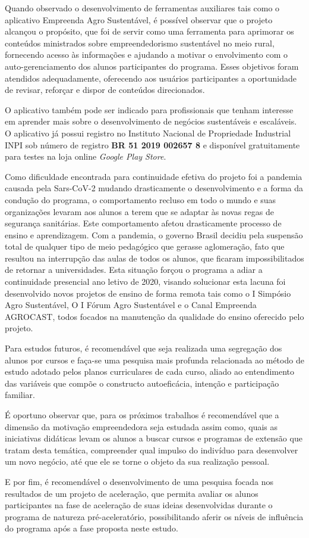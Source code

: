 Quando observado o desenvolvimento de ferramentas auxiliares tais como o aplicativo Empreenda Agro Sustentável, é possível observar que o projeto alcançou o propósito, que foi de servir como uma ferramenta para aprimorar os conteúdos ministrados sobre empreendedorismo sustentável no meio rural, fornecendo acesso às informações e ajudando a motivar o envolvimento com o auto-gerenciamento dos alunos participantes do programa. Esses objetivos foram atendidos adequadamente, oferecendo aos usuários participantes a oportunidade de revisar, reforçar e dispor de conteúdos direcionados.

O aplicativo também pode ser indicado para profissionais que tenham interesse em aprender mais sobre o desenvolvimento de negócios sustentáveis e escaláveis. O aplicativo já possui registro no Instituto Nacional de Propriedade Industrial INPI sob número de registro \textbf{BR 51 2019 002657 8} e disponível gratuitamente para testes na loja online \textit{Google Play Store}.


Como dificuldade encontrada para continuidade efetiva do projeto foi a pandemia causada pela Sars-CoV-2 mudando drasticamente o desenvolvimento e a forma da condução do programa, o comportamento recluso em todo o mundo  e suas organizações levaram aos alunos a terem que se adaptar às novas regas de segurança sanitárias. Este comportamento afetou drasticamente  processo de ensino e aprendizagem. Com a pandemia, o governo Brasil decidiu pela suspensão total de qualquer tipo de meio pedagógico que gerasse aglomeração, fato que resultou na interrupção das aulas de todos os alunos, que ficaram impossibilitados de retornar a universidades. Esta situação forçou o programa a adiar a continuidade presencial ano letivo de 2020, visando solucionar esta lacuna foi desenvolvido novos projetos de ensino de forma remota tais como o I Simpósio Agro Sustentável, O I Fórum Agro Sustentável e o Canal Empreenda AGROCAST, todos focados na manutenção da qualidade do ensino oferecido pelo projeto.

Para estudos futuros, é recomendável que seja realizada uma segregação dos alunos por cursos e faça-se uma pesquisa mais profunda relacionada ao método de estudo adotado pelos planos curriculares de cada curso, aliado ao entendimento das variáveis que compõe o constructo autoeficácia, intenção e participação familiar.

É oportuno observar que, para os próximos trabalhos é recomendável que a dimensão da motivação empreendedora seja estudada assim como, quais as iniciativas didáticas levam os alunos a buscar cursos e programas de extensão que tratam desta temática, compreender qual impulso do indivíduo para desenvolver um novo negócio, até que ele se torne o objeto da sua realização pessoal.

E por fim, é recomendável o desenvolvimento de uma pesquisa focada nos resultados de um projeto de aceleração, que permita avaliar os alunos participantes na fase de aceleração de suas ideias desenvolvidas durante o programa de natureza pré-aceleratório, possibilitando aferir os níveis de influência do programa após a fase proposta neste estudo.
